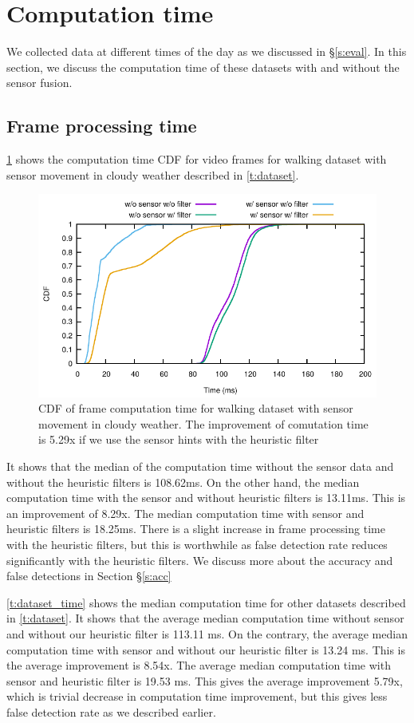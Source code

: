 \section{Computation time}
We collected data at different times of the day as we discussed in \S\ref{s:eval}.
In this section, we discuss the computation time of these datasets with and without the sensor fusion.

\subsection{Frame processing time}
\ref{f:cdf_cloudy} shows the computation time CDF for video frames for walking dataset with sensor movement in cloudy weather described in \ref{t:dataset}.
\begin{figure}[ht]
\centering
\includegraphics[width=5.2in]{plots/cloudy_cdf.pdf}
\caption{CDF of frame computation time for walking dataset with sensor movement in cloudy weather. The improvement of comutation time is 5.29x if we use the sensor hints with the heuristic filter}
\label{f:cdf_cloudy}
\end{figure}
It shows that the median of the computation time without the sensor data and without the heuristic filters is 108.62ms.
On the other hand, the median computation time with the sensor and without heuristic filters is 13.11ms.
This is an improvement of 8.29x.
The median computation time with sensor and heuristic filters is 18.25ms.
There is a slight increase in frame processing time with the heuristic filters, but this is worthwhile as false detection rate reduces significantly with the heuristic filters.  
We discuss more about the accuracy and false detections in Section \S\ref{s:acc}

\ref{t:dataset_time} shows the median computation time for other datasets described in \ref{t:dataset}.
It shows that the average median computation time without sensor and without our heuristic filter is 113.11 ms.
On the contrary, the average median computation time with sensor and without our heuristic filter is 13.24 ms.
This is the average improvement is 8.54x.
The average median computation time with sensor and heuristic filter is 19.53 ms.
This gives the average improvement 5.79x, which is trivial decrease in computation time improvement, but this gives less false detection rate as we described earlier.

